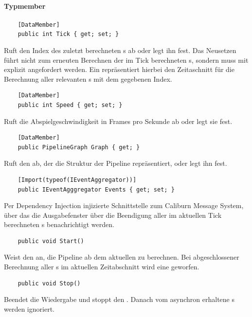 \paragraph{Typmember}
\begin{itemize}

	\begin{verbatim}
	[DataMember]
	public int Tick { get; set; }
	\end{verbatim}
	Ruft den Index des zuletzt berechneten s ab oder legt ihn fest. Das Neusetzen führt nicht zum erneuten Berechnen der im Tick berechneten s, sondern muss mit  explizit angefordert werden. Ein  repräsentiert hierbei den Zeitaschnitt für die Berechnung aller relevanten s mit dem gegebenen Index.

	\begin{verbatim}
	[DataMember]
	public int Speed { get; set; }
	\end{verbatim}
	Ruft die Abspielgeschwindigkeit in Frames pro Sekunde ab oder legt sie fest.

	\begin{verbatim}
	[DataMember]
	public PipelineGraph Graph { get; }
	\end{verbatim}
	Ruft den  ab, der die Struktur der Pipeline repräsentiert, oder legt ihn fest.

	\begin{verbatim}
	[Import(typeof(IEventAggregator))]
	public IEventAgggregator Events { get; set; }
	\end{verbatim}
	Per Dependency Injection injizierte Schnittstelle zum Caliburn Message System, über das die Ausgabefenster über die Beendigung aller im aktuellen Tick berechneten s benachrichtigt werden.



	\begin{verbatim}
	public void Start()
	\end{verbatim}
	Weist den  an, die Pipeline ab dem aktuellen  zu berechnen. Bei abgeschlossener Berechnung aller s im aktuellen Zeitabschnitt wird eine  geworfen.

	\begin{verbatim}
	public void Stop()
	\end{verbatim}
	Beendet die Wiedergabe und stoppt den . Danach vom  asynchron erhaltene s werden ignoriert.
\end{itemize}

